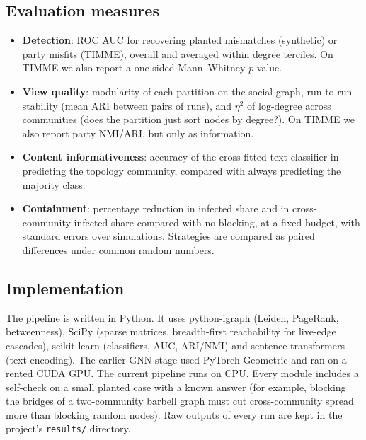 \subsection{Evaluation measures}
\begin{itemize}
  \item \textbf{Detection}: ROC AUC for recovering planted mismatches (synthetic) or
        party misfits (TIMME), overall and averaged within degree terciles. On TIMME
        we also report a one-sided Mann--Whitney $p$-value.
  \item \textbf{View quality}: modularity of each partition on the social graph,
        run-to-run stability (mean ARI between pairs of runs), and $\eta^2$ of log-degree
        across communities (does the partition just sort nodes by degree?). On TIMME
        we also report party NMI/ARI, but only as information.
  \item \textbf{Content informativeness}: accuracy of the cross-fitted text classifier
        in predicting the topology community, compared with always predicting the
        majority class.
  \item \textbf{Containment}: percentage reduction in infected share and in
        cross-community infected share compared with no blocking, at a fixed budget,
        with standard errors over simulations. Strategies are compared as paired
        differences under common random numbers.
\end{itemize}

\subsection{Implementation}
The pipeline is written in Python. It uses python-igraph (Leiden, PageRank,
betweenness), SciPy (sparse matrices, breadth-first reachability for live-edge
cascades), scikit-learn (classifiers, AUC, ARI/NMI) and sentence-transformers (text
encoding). The earlier GNN stage used PyTorch Geometric and ran on a rented CUDA GPU.
The current pipeline runs on CPU. Every module includes a self-check on a small planted
case with a known answer (for example, blocking the bridges of a two-community
barbell graph must cut cross-community spread more than blocking random nodes). Raw
outputs of every run are kept in the project's \texttt{results/} directory.
